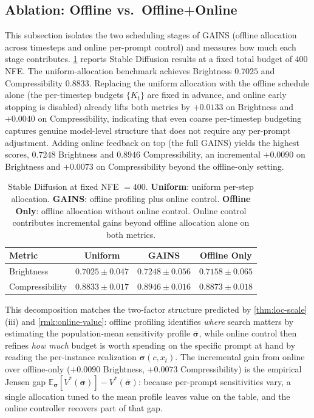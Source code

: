 \subsection{Ablation: Offline vs.\ Offline+Online}
\label{sec:appendix-ablation}
%
This subsection isolates the two scheduling stages of \textsc{GAINS} (offline allocation across timesteps and online per-prompt control) and measures how much each stage contributes. \cref{tab:sd_400_ablation} reports Stable Diffusion results at a fixed total budget of $400$ NFE. The uniform-allocation benchmark achieves Brightness $0.7025$ and Compressibility $0.8833$. Replacing the uniform allocation with the offline schedule alone (the per-timestep budgets $\{K_t\}$ are fixed in advance, and online early stopping is disabled) already lifts both metrics by $+0.0133$ on Brightness and $+0.0040$ on Compressibility, indicating that even coarse per-timestep budgeting captures genuine model-level structure that does not require any per-prompt adjustment. Adding online feedback on top (the full \textsc{GAINS}) yields the highest scores, $0.7248$ Brightness and $0.8946$ Compressibility, an incremental $+0.0090$ on Brightness and $+0.0073$ on Compressibility beyond the offline-only setting.

\begin{table}[h]
\centering
\caption{Stable Diffusion at fixed NFE $=400$. \textbf{Uniform}: uniform per-step allocation. \textbf{GAINS}: offline profiling plus online control. \textbf{Offline Only}: offline allocation without online control. Online control contributes incremental gains beyond offline allocation alone on both metrics.}
\label{tab:sd_400_ablation}
\small
\begin{tabular}{lccc}
\toprule
\textbf{Metric} & \textbf{Uniform} & \textbf{GAINS} & \textbf{Offline Only} \\
\midrule
Brightness & $0.7025\pm0.047$ & $\mathbf{0.7248\pm0.056}$ & $0.7158\pm0.065$ \\
Compressibility & $0.8833\pm0.017$ & $\mathbf{0.8946\pm0.016}$ & $0.8873\pm0.018$ \\
\bottomrule
\end{tabular}
\end{table}

This decomposition matches the two-factor structure predicted by \cref{thm:loc-scale}\textup{(iii)} and \cref{rmk:online-value}: offline profiling identifies \emph{where} search matters by estimating the population-mean sensitivity profile $\bar{\boldsymbol{\sigma}}$, while online control then refines \emph{how much} budget is worth spending on the specific prompt at hand by reading the per-instance realization $\boldsymbol{\sigma}(c, x_t)$. The incremental gain from online over offline-only ($+0.0090$ Brightness, $+0.0073$ Compressibility) is the empirical Jensen gap $\mathbb{E}_{\boldsymbol{\sigma}}[V^*(\boldsymbol{\sigma})] - V^*(\bar{\boldsymbol{\sigma}})$: because per-prompt sensitivities vary, a single allocation tuned to the mean profile leaves value on the table, and the online controller recovers part of that gap.

